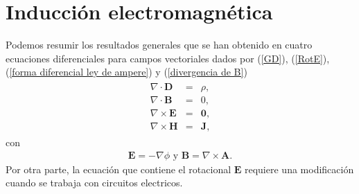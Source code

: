 \documentclass[11pt,fleqn]{book} %
\begin{document}

\pagestyle{empty} %
\tableofcontents %
\cleardoublepage %

\pagestyle{fancy} %


\chapter{Inducci\'on electromagn\'etica}
Podemos resumir los resultados generales que se han obtenido en cuatro ecuaciones diferenciales para campos vectoriales dados por (\ref{GD}), (\ref{RotE}), (\ref{forma diferencial ley de ampere}) y (\ref{divergencia de B})
\begin{eqnarray}\label{ecs electrostatica}
\begin{split}
\nabla\cdot\textbf{D}&=&\rho,\\
\nabla\cdot\textbf{B}&=&0,\\
\nabla\times\textbf{E}&=&\textbf{0},\\
\nabla\times\textbf{H}&=&\textbf{J},
\end{split}
\end{eqnarray}
con
\begin{eqnarray}
\textbf{E}=-\nabla\phi \,\,\mbox{y}\,\,\textbf{B}=\nabla\times\textbf{A}.\label{PotencialfA}
\end{eqnarray}
Por otra parte, la ecuaci\'on que contiene el rotacional $\textbf{E}$ requiere una modificaci\'on cuando se trabaja con circuitos electricos.
\end{document}
